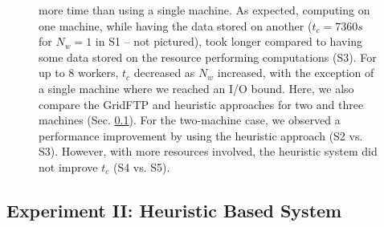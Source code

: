 \documentclass{rspublic}
\newcommand{\fixme}[1]{ { \bf{ ***FIXME: #1
}} } \newcommand{\jhanote}[1]{ {\textcolor{red} { ***Jha: #1 }}}
\newcommand{\micnote}[1]{ {\textcolor{blue} { ***Michael: #1 }}}
\newcommand{\betynote}[1]{ {\textcolor{orange} { ***Bety: #1 }}}
\newcommand{\jhanote}[1]{} \newcommand{\micnote}[1]{}\newcommand{\betynote}[1]{} \newcommand{\fixme}[1]{}
\begin{document}
\begin{figure}[!ht]
\begin{center}
{more time than using a single machine. As expected, computing on one
machine, while having the data stored on another ($t_c=7360s$ for $N_w=1$ in S1 -- not pictured), took longer
compared to having some data stored on the resource performing
computations (S3). For up to 8 workers, $t_c$ decreased as $N_w$
increased, with the exception of a single machine where we reached an
I/O bound. Here, we also compare the GridFTP and heuristic
approaches for two and three machines (Sec. \ref{Sec:Heuristic}). For
the two-machine case, we observed a performance improvement by using the
heuristic approach (S2 vs. S3). However, with more resources involved,
the heuristic system did not improve $t_c$ (S4 vs. S5).}
\label{Fig:ExpIConventionalLocal}
\end{center}
\vspace{-0.3cm}
\end{figure}





\vspace{-0.4cm}

\subsection{Experiment II: Heuristic Based System}\label{Sec:Heuristic}

\vspace{-0.1cm}
\end{document}
